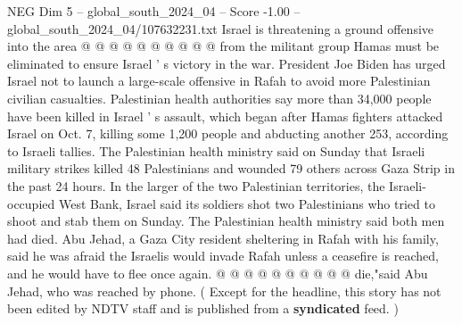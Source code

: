\begin{textsample}{NEG Dim 5 – global\_south\_2024\_04 – Score -1.00 – global\_south\_2024\_04/107632231.txt}
Israel is threatening a ground offensive into the area @ @ @ @ @ @ @ @ @ @ from the militant group Hamas must be eliminated to ensure Israel ' s victory in the war.
President Joe Biden has urged Israel not to launch a large-scale offensive in Rafah to avoid more Palestinian civilian casualties.
Palestinian health authorities say more than 34,000 people have been killed in Israel ' s assault, which began after Hamas fighters attacked Israel on Oct. 7, killing some 1,200 people and abducting another 253, according to Israeli tallies.
The Palestinian health ministry said on Sunday that Israeli military strikes killed 48 Palestinians and wounded 79 others across Gaza Strip in the past 24 hours.
In the larger of the two Palestinian territories, the Israeli-occupied West Bank, Israel said its soldiers shot two Palestinians who tried to shoot and stab them on Sunday.
The Palestinian health ministry said both men had died.
Abu Jehad, a Gaza City resident sheltering in Rafah with his family, said he was afraid the Israelis would invade Rafah unless a ceasefire is reached, and he would have to flee once again. @ @ @ @ @ @ @ @ @ @ die,"said Abu Jehad, who was reached by phone. ( Except for the headline, this story has not been edited by NDTV staff and is published from a \textbf{syndicated} feed. )

\end{textsample}
